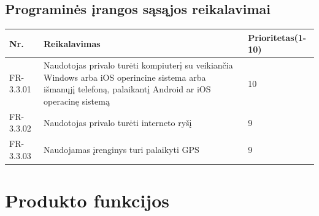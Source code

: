 \documentclass[oneside]{VUMIFPSkursinis}
\begin{document}
\subsection{Programinės įrangos sąsąjos reikalavimai}
\begin{table}[htbp]
	\begin{tabularx}{1\textwidth}{ |P{2.5cm}|X|P{3cm }| }  \hline
		Nr. & Reikalavimas & Prioritetas(1-10) \\ \hline
		FR-3.3.01 & Naudotojas privalo turėti kompiuterį su veikiančia Windows arba iOS operincine sistema arba išmanųjį telefoną, palaikantį Android ar iOS operacinę sistemą & 10 \\ \hline
		FR-3.3.02 & Naudotojas privalo turėti interneto ryšį & 9 \\ \hline
		FR-3.3.03 & Naudojamas įrenginys turi palaikyti GPS & 9 \\ \hline
	\end{tabularx}
\end{table}
\pagebreak


\section{Produkto funkcijos}
\end{document}
